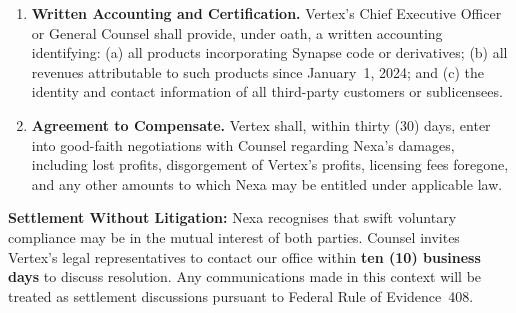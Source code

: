 \begin{enumerate}[leftmargin=2.2em, itemsep=10pt, label=\textbf{\arabic*.}]
  \item[\textbf{5.}]
    \textbf{Written Accounting and Certification.}
    Vertex's Chief Executive Officer or General Counsel shall provide, under
    oath, a written accounting identifying: (a) all products incorporating
    Synapse code or derivatives; (b) all revenues attributable to such products
    since January~1, 2024; and (c) the identity and contact information of all
    third-party customers or sublicensees.

  \item[\textbf{6.}]
    \textbf{Agreement to Compensate.}
    Vertex shall, within thirty (30) days, enter into good-faith negotiations
    with Counsel regarding Nexa's damages, including lost profits, disgorgement
    of Vertex's profits, licensing fees foregone, and any other amounts to which
    Nexa may be entitled under applicable law.

\end{enumerate}

\vspace{8pt}

\begin{noticebox}
  \textcolor{NexaNavy}{\faInfoCircle\;\bfseries Settlement Without Litigation:}
  Nexa recognises that swift voluntary compliance may be in the mutual
  interest of both parties. Counsel invites Vertex's legal representatives
  to contact our office within \textbf{ten (10) business days} to discuss
  resolution. Any communications made in this context will be treated as
  settlement discussions pursuant to Federal Rule of Evidence~408.
\end{noticebox}
